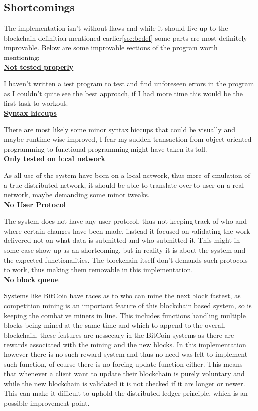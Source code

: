 \documentclass[paper=a4, fontsize=11pt]{scrartcl} %
\numberwithin{equation}{section} %
\numberwithin{figure}{section} %
\numberwithin{table}{section} %
\begin{document}
\subsection{Shortcomings}

The implementation isn't without flaws and while it should live up to the blockchain definition mentioned earlier\ref{sec:bcdef} some parts are most definitely improvable. Below are some improvable sections of the program worth mentioning:\\

\underline{\textbf{Not tested properly}}

I haven't written a test program to test and find unforeseen errors in the program as I couldn't quite see the best approach, if I had more time this would be the first task to workout.\\
\newpage
\underline{\textbf{Syntax hiccups}}

There are most likely some minor syntax hiccups that could be visually and maybe runtime wise improved, I fear my sudden transaction from object oriented programming to functional programming might have taken its toll.\\

\underline{\textbf{Only tested on local network}}

As all use of the system have been on a local network, thus more of emulation of a true distributed network, it should be able to translate over to user on a real network, maybe demanding some minor tweaks.\\

\underline{\textbf{No User Protocol}}

The system does not have any user protocol, thus not keeping track of who and where certain changes have been made, instead it focused on validating the work delivered not on what data is submitted and who submitted it. This might in some case show up as an shortcoming, but in reality it is about the system and the expected functionalities. The blockchain itself don't demands such protocols to work, thus making them removable in this implementation.\\

\underline{\textbf{No block queue}}

Systems like BitCoin have races as to who can mine the next block fastest, as competition mining is an important feature of this blockchain  based system, so is keeping the combative miners in line. This includes functions handling multiple blocks being mined at the same time and which to append to the overall blockchain, these features are nessecary in the BitCoin systems as there are rewards associated with the mining and the new blocks. In this implementation however there is no such reward system and thus no need was felt to implement such function, of course there is no forcing update function either. This means that whenever a client want to update their blockchain is purely voluntary and while the new blockchain is validated it is not checked if it are longer or newer. This can make it difficult to uphold the distributed ledger principle, which is an possible improvement point.  
\end{document}
